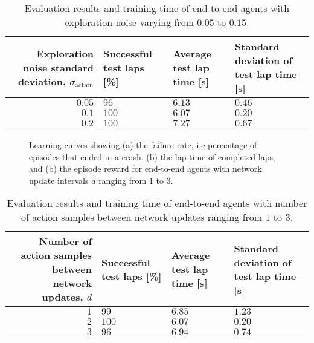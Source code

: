 \begin{table}[h]
\centering
\renewcommand{\arraystretch}{1.2}
\small
\begin{tabularx}{\textwidth}{RLLL} 
    \hline
    \textbf{Exploration noise standard deviation},  $\sigma_{\text{action}}$ & \textbf{Successful test laps [\%]} & \textbf{Average test lap time [s]} & \textbf{Standard deviation of test lap time [s]}\\ 
    \hline
    $0.05$   &   $96$   & $6.13$  & $0.46$      \\     
    $0.1$   &   $100$   & $6.07$  & $0.20$      \\      
    $0.2$   &   $100$   & $7.27$  &  $0.67$     \\
    \hline
\end{tabularx}
\caption[Evaluation results and training time of end-to-end agents with varied exploration noise]{Evaluation results and training time of end-to-end agents with exploration noise varying from $0.05$ to $0.15$.}
\label{tab:noise_test_results}
\end{table}

\newpage

\begin{figure}[h]
    \centering
    
    \caption[Learning curves for tuning the network update interval]{Learning curves showing (a) the failure rate, i.e percentage of episodes that ended in  a crash, (b) the lap time of completed laps, and (b) the episode reward for end-to-end agents with network update intervals $d$ ranging from $1$ to $3$.}
    \label{fig:d}
\end{figure}

\begin{table}[h]
\centering
\renewcommand{\arraystretch}{1.2}
\small
\begin{tabularx}{\textwidth}{RLLL} 
    \hline
    \textbf{Number of action samples between network updates, $d$} & \textbf{Successful test laps [\%]} & \textbf{Average test lap time [s]} & \textbf{Standard deviation of test lap time [s]}\\ 
    \hline
    $1$   &   $99$   & $6.85$  & $1.23$      \\     
    $2$   &   $100$   & $6.07$  & $0.20$      \\      
    $3$   &   $96$   & $6.94$  &  $0.74$     \\
    \hline
\end{tabularx}
\caption[Evaluation results and training time of end-to-end agents with varied number of action samples between network updates]{Evaluation results and training time of end-to-end agents with number of action samples between network updates ranging from $1$ to $3$.}
\label{tab:d_test_results}
\end{table}



